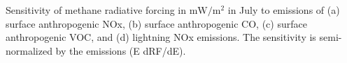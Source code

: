 Sensitivity of methane radiative forcing in $\mathrm{mW/m^2}$ in July to emissions of (a) surface anthropogenic NOx, (b) surface anthropogenic CO, (c) surface anthropogenic VOC, and (d) lightning NOx emissions. The sensitivity is semi-normalized by the emissions (E dRF/dE). \label{fig:rfsens}